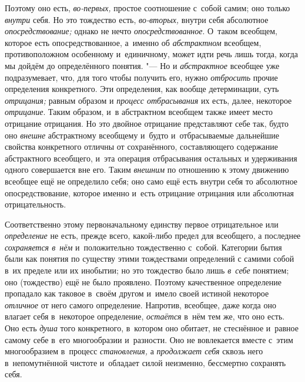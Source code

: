Поэтому оно есть, {\em во-первых,} простое соотношение с~собой самим; оно
только {\em внутри} себя. Но это тождество есть, {\em во-вторых,} внутри себя
абсолютное {\em опосредствование;} однако не нечто {\em опосредствованное}.
О~таком всеобщем, которое есть опосредствованное, а~именно об {\em абстрактном}
всеобщем, противоположном особенному и~единичному, может идти речь лишь тогда,
когда мы дойдём до определённого понятия. "--- Но и {\em абстрактное} всеобщее
уже подразумевает, что, для того чтобы получить его, нужно {\em отбросить}
прочие определения конкретного. Эти определения, как вообще детерминации, суть
{\em отрицания;} равным образом и {\em процесс отбрасывания} их есть, далее,
некоторое {\em отрицание}. Таким образом, и~в абстрактном всеобщем также имеет
место отрицание отрицания. Но это двойное отрицание представляют себе так,
будто оно {\em внешне} абстрактному всеобщему и~будто и~отбрасываемые
дальнейшие свойства конкретного отличны от сохранённого, составляющего
содержание абстрактного всеобщего, и~эта операция отбрасывания остальных и
удерживания одного совершается вне его. Таким {\em внешним} по отношению к
этому движению всеобщее ещё не определило себя; оно само ещё есть внутри себя
то абсолютное опосредствование, которое именно и~есть отрицание отрицания или
абсолютная отрицательность.

Соответственно этому первоначальному единству первое отрицательное или
{\em определение} не есть, прежде всего, какой-либо предел для всеобщего,
а последнее {\em сохраняется в~нём} и~положительно тождественно с~собой.
Категории бытия были как понятия по существу этими тождествами определений
с самими собой в~их пределе или их инобытии; но это тождество было лишь
{\em в~себе} понятием; оно (тождество) ещё не было проявлено. Поэтому
качественное определение пропадало как таковое в~своём другом и~имело своей
истиной некоторое {\em отличное} от него самого определение. Напротив,
всеобщее, даже когда оно влагает себя в~некоторое определение, {\em остаётся}
в~нём тем же, что оно есть. Оно есть {\em душа} того конкретного, в~котором оно
обитает, не стеснённое и~равное самому себе в~его многообразии и~разности. Оно
не вовлекается вместе с~этим многообразием в~процесс {\em становления,}
а {\em продолжает себя} сквозь него в~непомутнённой чистоте и~обладает силой
неизменно, бессмертно сохранять себя.

